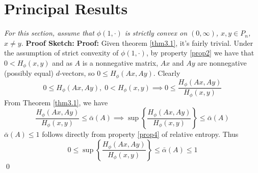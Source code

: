 \section{Principal Results}\label{results}
\textit{For this section, assume that $\phi(1, \cdot)$ is strictly convex on $(0, \infty)$, $x,y \in P_n$, $x \neq y$.}
\label{thm3.1}
\textbf{Proof Sketch:}
\label{thm4.1}
\noindent\textbf{Proof:} Given theorem \ref{thm3.1}, it's fairly trivial. Under the assumption of strict convexity of $\phi(1, \cdot)$, by property \ref{prop2} we have that $0 < H_\phi(x, y)$ and as $A$ is a nonnegative matrix, $Ax$ and $Ay$ are nonnegative (possibly equal) $d$-vectors, so $0 \leq H_\phi(Ax, Ay)$. Clearly
    \[0 \leq H_\phi(Ax, Ay), \; 0<H_\phi(x,y) \implies 0\leq \frac{H_\phi(Ax, Ay)}{H_\phi(x,y)}\]
    From Theorem \ref{thm3.1}, we have
    \[\frac{H_\phi(Ax, Ay) }{H_\phi(x,y)}\leq \bar{\alpha}(A) \implies \sup \left\{\frac{H_\phi(Ax, Ay)}{H_\phi(x,y)}\right\} \leq \bar{\alpha}(A)\]
$\bar{\alpha}(A) \leq 1$ follows directly from property \ref{prop4} of relative entropy. Thus 
\[ 0 \leq \sup \left\{\frac{H_\phi(Ax, Ay)}{H_\phi(x,y)}\right\} \leq \bar{\alpha}(A) \leq 1 \]
\qed 

